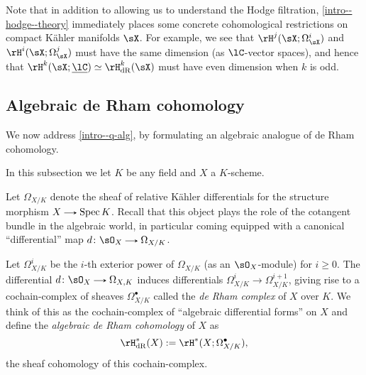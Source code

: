 \begin{remark}
  \label{intro--hodge--constraint}
  Note that in addition to allowing us to understand the Hodge filtration, \cref{intro--hodge--theory} immediately places some concrete cohomological restrictions on compact K\"ahler manifolds $\sX$. For example, we see that $\rH^j(\sX;\Omega^i_{\sX})$ and $\rH^i(\sX;\Omega^j_{\sX})$ must have the same dimension (as $\lC$-vector spaces), and hence that $\rH^k(\sX;\u\lC) \iso \rH_\dR^k(\sX)$ must have even dimension when $k$ is odd.
\end{remark}


\subsection{Algebraic de Rham cohomology}
\label{intro--alg}

We now address \cref{intro--q-alg}, by formulating an algebraic analogue of de Rham cohomology.

\begin{situation}
  \label{intro--alg--hyp}
  In this subsection we let $K$ be any field and $X$ a $K$-scheme.
\end{situation}

\begin{notation}
  \label{intro--kahler-differentials}
  Let $\Omega_{X/K}$ denote the sheaf of relative K\"ahler differentials for the structure morphism $X \to \Spec K$. Recall that this object plays the role of the cotangent bundle in the algebraic world, in particular coming equipped with a canonical ``differential'' map $d \c \sO_X \to \Omega_{X/K}$.
\end{notation}

\begin{definition}
  \label{intro--algebraic-derham}
   Let $\Omega_{X/K}^i$ be the $i$-th exterior power of $\Omega_{X/K}$ (as an $\sO_X$-module) for $i\ge 0$. The differential $d \c \sO_X \to \Omega_{X,K}$ induces differentials $\Omega_{X/K}^i \to \Omega_{X/K}^{i+1}$, giving rise to a cochain-complex of sheaves $\Omega_{X/K}^\bullet$ called the \emph{de Rham complex} of $X$ over $K$. We think of this as the cochain-complex of ``algebraic differential forms'' on $X$ and define the \emph{algebraic de Rham cohomology} of $X$ as
  \[
    \rH^*_\dR(X) \ce \rH^*(X;\Omega_{X/K}^\bullet),
  \]
  the sheaf cohomology of this cochain-complex.
\end{definition}

